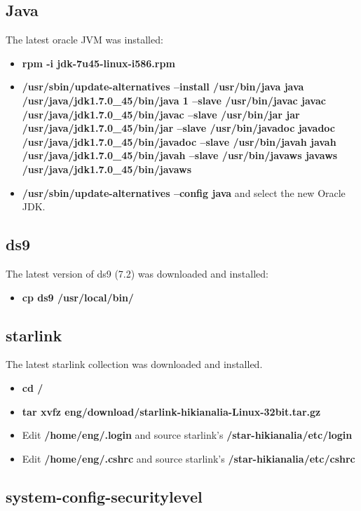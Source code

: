 \documentclass[10pt,a4paper]{article}
\begin{document}
\subsection{Java}

The latest oracle JVM was installed: 

\begin{itemize}
\item {\bf rpm -i jdk-7u45-linux-i586.rpm}
\item {\bf/usr/sbin/update-alternatives --install /usr/bin/java java /usr/java/jdk1.7.0\_45/bin/java 1 --slave /usr/bin/javac javac /usr/java/jdk1.7.0\_45/bin/javac --slave /usr/bin/jar jar /usr/java/jdk1.7.0\_45/bin/jar --slave /usr/bin/javadoc javadoc /usr/java/jdk1.7.0\_45/bin/javadoc --slave /usr/bin/javah javah /usr/java/jdk1.7.0\_45/bin/javah --slave /usr/bin/javaws javaws /usr/java/jdk1.7.0\_45/bin/javaws}
\item {\bf/usr/sbin/update-alternatives --config java} and select the new Oracle JDK.
\end{itemize}

\subsection{ds9}

The latest version of ds9 (7.2) was downloaded and installed:

\begin{itemize}
\item {\bf cp ds9 /usr/local/bin/}
\end{itemize}

\subsection{starlink}

The latest starlink collection was downloaded and installed.

\begin{itemize}
\item {\bf cd /}
\item {\bf tar xvfz \mytilde eng/download/starlink-hikianalia-Linux-32bit.tar.gz}
\item Edit {\bf /home/eng/.login} and source starlink's {\bf /star-hikianalia/etc/login}
\item Edit {\bf /home/eng/.cshrc} and source starlink's {\bf /star-hikianalia/etc/cshrc}
\end{itemize}

\subsection{system-config-securitylevel}
\end{document}

